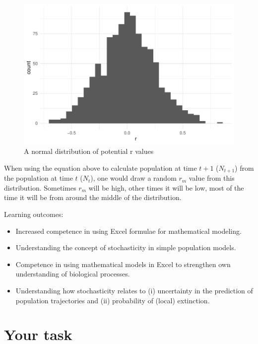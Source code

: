 \documentclass[
  a4paper]{book}
\providecommand{\tightlist}{%
  \setlength{\itemsep}{0pt}\setlength{\parskip}{0pt}}
\begin{document}
\begin{figure}

{\centering \includegraphics{BB512_files/figure-latex/stochGrowthRate-1} 

}

\caption{A normal distribution of potential r values}\label{fig:stochGrowthRate}
\end{figure}

When using the equation above to calculate population at time \(t+1\) (\(N_{t+1}\)) from the population at time \(t\) (\(N_t\)), one would draw a random \(r_m\) value from this distribution. Sometimes \(r_m\) will be high, other times it will be low, most of the time it will be from around the middle of the distribution.

\begin{do-something}
Learning outcomes:

\begin{itemize}
\tightlist
\item
  Increased competence in using Excel formulae for mathematical
  modeling.
\item
  Understanding the concept of stochasticity in simple population
  models.
\item
  Competence in using mathematical models in Excel to strengthen own
  understanding of biological processes.
\item
  Understanding how stochasticity relates to (i) uncertainty in the
  prediction of population trajectories and (ii) probability of (local)
  extinction.
\end{itemize}
\end{do-something}

\section{Your task}\label{your-task-4}
\end{document}
